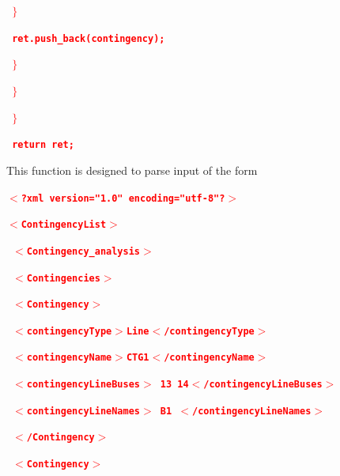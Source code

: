 \documentclass[12pt]{report} %
\begin{document}
\textcolor{red}{\texttt{\textbf{        $\boldsymbol{\mathrm{\}}}$}}}

\textcolor{red}{\texttt{\textbf{        ret.push\_back(contingency);}}}

\textcolor{red}{\texttt{\textbf{      $\boldsymbol{\mathrm{\}}}$}}}

\textcolor{red}{\texttt{\textbf{    $\boldsymbol{\mathrm{\}}}$}}}

\textcolor{red}{\texttt{\textbf{  $\boldsymbol{\mathrm{\}}}$}}}

\textcolor{red}{\texttt{\textbf{  return ret;}}}

This function is designed to parse input of the form

\textcolor{red}{\texttt{\textbf{$\boldsymbol{\mathrm{<}}$?xml version="1.0" encoding="utf-8"?$\boldsymbol{\mathrm{>}}$}}}

\textcolor{red}{\texttt{\textbf{$\boldsymbol{\mathrm{<}}$ContingencyList$\boldsymbol{\mathrm{>}}$}}}

\textcolor{red}{\texttt{\textbf{  $\boldsymbol{\mathrm{<}}$Contingency\_analysis$\boldsymbol{\mathrm{>}}$}}}

\textcolor{red}{\texttt{\textbf{    $\boldsymbol{\mathrm{<}}$Contingencies$\boldsymbol{\mathrm{>}}$}}}

\textcolor{red}{\texttt{\textbf{      $\boldsymbol{\mathrm{<}}$Contingency$\boldsymbol{\mathrm{>}}$}}}

\textcolor{red}{\texttt{\textbf{        $\boldsymbol{\mathrm{<}}$contingencyType$\boldsymbol{\mathrm{>}}$Line$\boldsymbol{\mathrm{<}}$/contingencyType$\boldsymbol{\mathrm{>}}$}}}

\textcolor{red}{\texttt{\textbf{        $\boldsymbol{\mathrm{<}}$contingencyName$\boldsymbol{\mathrm{>}}$CTG1$\boldsymbol{\mathrm{<}}$/contingencyName$\boldsymbol{\mathrm{>}}$}}}

\textcolor{red}{\texttt{\textbf{        $\boldsymbol{\mathrm{<}}$contingencyLineBuses$\boldsymbol{\mathrm{>}}$ 13 14$\boldsymbol{\mathrm{<}}$/contingencyLineBuses$\boldsymbol{\mathrm{>}}$}}}

\textcolor{red}{\texttt{\textbf{        $\boldsymbol{\mathrm{<}}$contingencyLineNames$\boldsymbol{\mathrm{>}}$ B1 $\boldsymbol{\mathrm{<}}$/contingencyLineNames$\boldsymbol{\mathrm{>}}$}}}

\textcolor{red}{\texttt{\textbf{      $\boldsymbol{\mathrm{<}}$/Contingency$\boldsymbol{\mathrm{>}}$}}}

\textcolor{red}{\texttt{\textbf{      $\boldsymbol{\mathrm{<}}$Contingency$\boldsymbol{\mathrm{>}}$}}}
\end{document}
